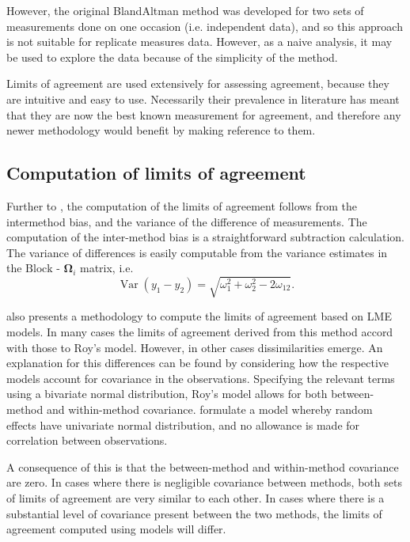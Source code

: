 \documentclass[12pt, a4paper]{report}
\theoremstyle{plain}
\theoremstyle{definition}
\theoremstyle{remark}
\begin{document}
			However, the original BlandAltman method was developed for two sets of measurements done on one occasion (i.e. independent data), and so this approach is not suitable for replicate measures data. However, as a naive analysis, it may be used to explore the data because of the simplicity of the method.
			



	Limits of agreement are used extensively for assessing agreement, because they are intuitive and easy to use.
	Necessarily their prevalence in literature has meant that they are now the best known measurement for agreement, and therefore any newer methodology would benefit by making reference to them.
	
\subsection{Computation of limits of agreement }


Further to \citet{BA86}, the computation of the limits of agreement follows from the intermethod bias, and the variance of the difference of measurements. The computation of the inter-method bias is a straightforward subtraction calculation. The variance of differences is easily computable from the variance estimates in the ${\mbox{Block - }\boldsymbol \Omega_{i}}$ matrix, i.e.
\[
\operatorname{Var}(y_1 - y_2) = \sqrt{ \omega^2_1 + \omega^2_2 - 2\omega_{12}}.
\]

\citet{BXC2008} also presents a methodology to compute the limits of agreement based on LME models. In many cases the limits of agreement derived from this method accord with those to Roy's model. However, in other cases dissimilarities emerge. An explanation for this differences can be found by considering how the respective models account for covariance in the observations. Specifying the relevant terms using a bivariate normal distribution, Roy's model allows for both between-method and within-method covariance. \citet{BXC2008} formulate a model whereby random effects have univariate normal distribution, and no allowance is made for correlation between observations.

A consequence of this is that the between-method and within-method covariance are zero. In cases where there is negligible covariance between methods, both sets of limits of agreement are very similar to each other. In cases where there is a substantial level of covariance present between the two methods, the limits of agreement computed using models will differ.
\end{document}
